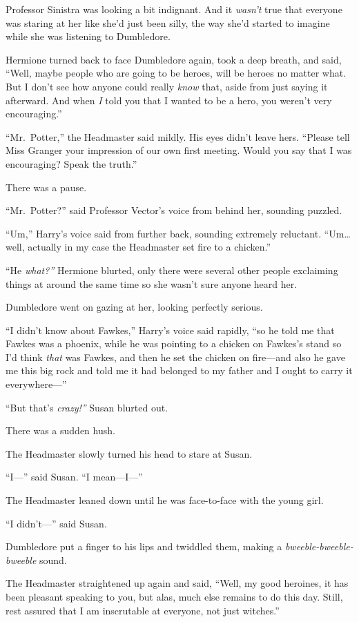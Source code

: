 Professor Sinistra was looking a bit indignant. And it \emph{wasn't}
true that everyone was staring at her like she'd just been silly, the
way she'd started to imagine while she was listening to Dumbledore.

Hermione turned back to face Dumbledore again, took a deep breath, and
said, ``Well, maybe people who are going to be heroes, will be heroes no
matter what. But I don't see how anyone could really \emph{know} that,
aside from just saying it afterward. And when \emph{I} told you that I
wanted to be a hero, you weren't very encouraging.''

``Mr.~Potter,'' the Headmaster said mildly. His eyes didn't leave hers.
``Please tell Miss Granger your impression of our own first meeting.
Would you say that I was encouraging? Speak the truth.''

There was a pause.

``Mr.~Potter?'' said Professor Vector's voice from behind her, sounding
puzzled.

``Um,'' Harry's voice said from further back, sounding extremely
reluctant. ``Um\ldots{} well, actually in my case the Headmaster set
fire to a chicken.''

``He \emph{what?''} Hermione blurted, only there were several other
people exclaiming things at around the same time so she wasn't sure
anyone heard her.

Dumbledore went on gazing at her, looking perfectly serious.

``I didn't know about Fawkes,'' Harry's voice said rapidly, ``so he told
me that Fawkes was a phoenix, while he was pointing to a chicken on
Fawkes's stand so I'd think \emph{that} was Fawkes, and then he set the
chicken on fire---and also he gave me this big rock and told me it had
belonged to my father and I ought to carry it everywhere---''

``But that's \emph{crazy!''} Susan blurted out.

There was a sudden hush.

The Headmaster slowly turned his head to stare at Susan.

``I---'' said Susan. ``I mean---I---''

The Headmaster leaned down until he was face-to-face with the young
girl.

``I didn't---'' said Susan.

Dumbledore put a finger to his lips and twiddled them, making a
\emph{bweeble-bweeble-bweeble} sound.

The Headmaster straightened up again and said, ``Well, my good heroines,
it has been pleasant speaking to you, but alas, much else remains to do
this day. Still, rest assured that I am inscrutable at everyone, not
just witches.''

